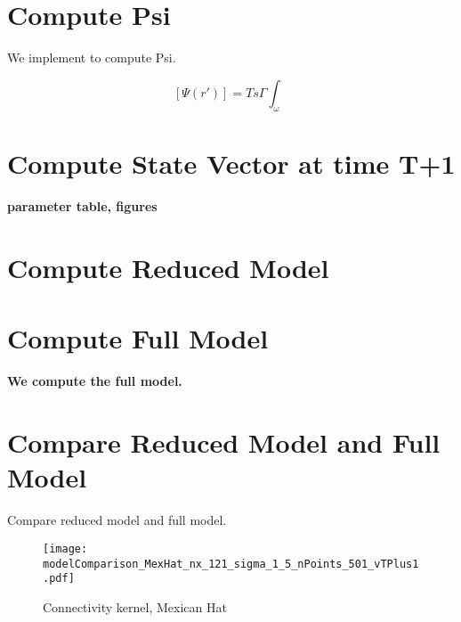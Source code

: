\documentclass[a4paper, 12pt, english]{article}
\begin{document}
\newpage



\section{Compute Psi}
We implement to compute Psi.

\[[\Psi(r\prime)] = Ts\Gamma\int_\omega\]


\newpage


\section{Compute State Vector at time T+1}
\label{state vector}
\paragraph{parameter table, figures}

\newpage





\section{Compute Reduced Model}

\newpage





\section{Compute Full Model}
\paragraph{We compute the full model.}

\newpage


\section{Compare Reduced Model and Full Model}
Compare reduced model and full model.
\begin{figure}
\centering
\texttt{[image: modelComparison\_MexHat\_nx\_121\_sigma\_1\_5\_nPoints\_501\_vTPlus1.pdf]}
\caption{Connectivity kernel, Mexican Hat}
\end{figure}
\end{document}
